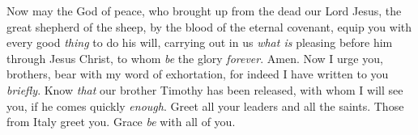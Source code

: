 \begin{biblechapter}
 Now may the God of peace, who brought up from the dead our Lord Jesus, the great shepherd of the sheep, by the blood of the eternal covenant,
\verse equip you with every good \textit{thing} to do his will, carrying out in us \textit{what is} pleasing before him through Jesus Christ, to whom \textit{be} the glory \textit{forever}. Amen.
 Now I urge you, brothers, bear with my word of exhortation, for indeed I have written to you \textit{briefly}.
\verse Know \textit{that} our brother Timothy has been released, with whom I will see you, if he comes quickly \textit{enough}.
\verse Greet all your leaders and all the saints. Those from Italy greet you.
\verse Grace \textit{be} with all of you.
\end{biblechapter}

